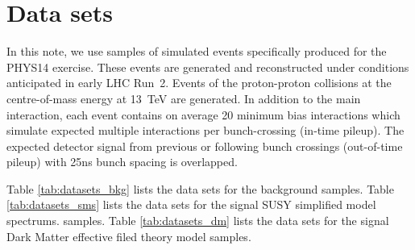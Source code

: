 \section{Data sets}
\label{sec:datasets}

In this note, we use samples of simulated events specifically produced
for the PHYS14 exercise. These events are generated and reconstructed
under conditions anticipated in early LHC Run~2. Events of the
proton-proton collisions at the centre-of-mass energy at 13~TeV are
generated. In addition to the main interaction, each event contains on
average 20 minimum bias interactions which simulate expected multiple
interactions per bunch-crossing (in-time pileup). The expected detector
signal from previous or following bunch crossings (out-of-time pileup)
with 25ns bunch spacing is overlapped.

Table \ref{tab:datasets_bkg} lists the data sets for the background
samples. Table \ref{tab:datasets_sms} lists the data sets for the signal
SUSY simplified model spectrums. samples. Table \ref{tab:datasets_dm}
lists the data sets for the signal
Dark Matter effective filed theory model samples.


\begin{landscape}
\begin{table}[!h]
\scriptsize 
\label{tab:datasets_bkg}
\end{table}
\end{landscape}

\begin{landscape}
\begin{table}[!h]
\scriptsize 
\label{tab:datasets_sms}
\end{table}

\begin{table}[!h]
\scriptsize 
\label{tab:datasets_dm}
\end{table}
\end{landscape}



